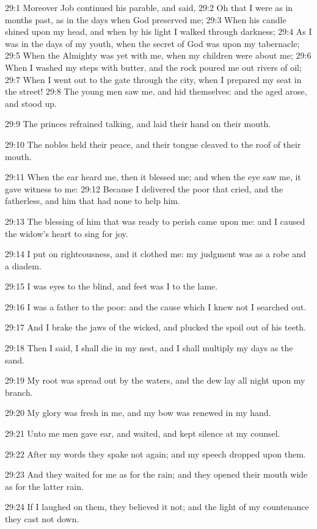 29:1 Moreover Job continued his parable, and said, 29:2 Oh that I were
as in months past, as in the days when God preserved me; 29:3 When his
candle shined upon my head, and when by his light I walked through
darkness; 29:4 As I was in the days of my youth, when the secret of
God was upon my tabernacle; 29:5 When the Almighty was yet with me,
when my children were about me; 29:6 When I washed my steps with
butter, and the rock poured me out rivers of oil; 29:7 When I went out
to the gate through the city, when I prepared my seat in the street!
29:8 The young men saw me, and hid themselves: and the aged arose, and
stood up.

29:9 The princes refrained talking, and laid their hand on their
mouth.

29:10 The nobles held their peace, and their tongue cleaved to the
roof of their mouth.

29:11 When the ear heard me, then it blessed me; and when the eye saw
me, it gave witness to me: 29:12 Because I delivered the poor that
cried, and the fatherless, and him that had none to help him.

29:13 The blessing of him that was ready to perish came upon me: and I
caused the widow's heart to sing for joy.

29:14 I put on righteousness, and it clothed me: my judgment was as a
robe and a diadem.

29:15 I was eyes to the blind, and feet was I to the lame.

29:16 I was a father to the poor: and the cause which I knew not I
searched out.

29:17 And I brake the jaws of the wicked, and plucked the spoil out of
his teeth.

29:18 Then I said, I shall die in my nest, and I shall multiply my
days as the sand.

29:19 My root was spread out by the waters, and the dew lay all night
upon my branch.

29:20 My glory was fresh in me, and my bow was renewed in my hand.

29:21 Unto me men gave ear, and waited, and kept silence at my
counsel.

29:22 After my words they spake not again; and my speech dropped upon
them.

29:23 And they waited for me as for the rain; and they opened their
mouth wide as for the latter rain.

29:24 If I laughed on them, they believed it not; and the light of my
countenance they cast not down.

